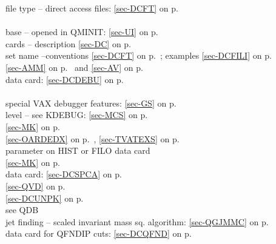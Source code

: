  file type -- direct access files: \ref{sec-DCFT} on p.~\pageref{sec-DCFT}\\
 \\
 \mysubitem  base -- opened in QMINIT: \ref{sec-UI} on p.~\pageref{sec-UI}\\
 \mysubitem cards -- description \ref{sec-DC} on p.~\pageref{sec-DC}\\
 \mysubitem set name --conventions \ref{sec-DCFT} on p.~\pageref{sec-DCFT};
 examples \ref{sec-DCFILI} on p.~\pageref{sec-DCFILI}\\
 \ref{sec-AMM} on p.~\pageref{sec-AMM} and
 \ref{sec-AV} on p.~\pageref{sec-AV}\\
 data card: \ref{sec-DCDEBU} on p.~\pageref{sec-DCDEBU}\\
 \\
 \mysubitem special VAX debugger features: \ref{sec-GS} on p.~\pageref{sec-GS}\\
 \mysubitem level -- see KDEBUG: \ref{sec-MCS} on p.~\pageref{sec-MCS}\\
 \ref{sec-MK} on p.~\pageref{sec-MK}\\
 \ref{sec-OARDEDX} on p.~\pageref{sec-OARDEDX},
 \ref{sec-TVATEXS} on p.~\pageref{sec-TVATEXS}\\
 parameter on HIST or FILO  data card \\
 \ref{sec-MK} on p.~\pageref{sec-MK}\\
 data card: \ref{sec-DCSPCA} on p.~\pageref{sec-DCSPCA}\\
 \ref{sec-QVD} on p.~\pageref{sec-QVD}\\
 \ref{sec-DCUNPK} on p.~\pageref{sec-DCUNPK}\\
 see QDB\\
 jet finding -- scaled invariant mass sq. algorithm:
 \ref{sec-QGJMMC} on p.~\pageref{sec-QGJMMC}\\
 data card for QFNDIP cuts: \ref{sec-DCQFND} on p.~\pageref{sec-DCQFND}
 

